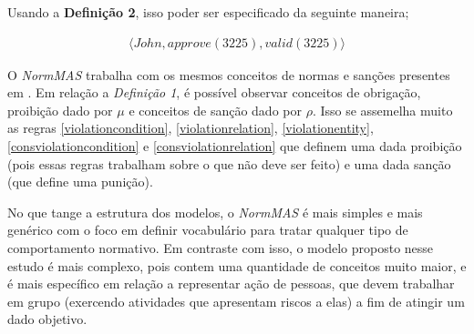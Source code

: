 Usando a \textbf{Definição 2}, isso poder ser especificado da seguinte maneira; 

\begin{eqnarray}
    \langle John, approve(3225), valid(3225)\rangle
\end{eqnarray}

O \textit{NormMAS} trabalha com os mesmos conceitos de normas e sanções presentes em \cite{dastaniframework}. Em relação a \textit{Definição 1}, é possível observar conceitos de obrigação, proibição dado por $ \mu $ e conceitos de sanção dado por $\rho$. Isso se assemelha muito as regras \ref{violationcondition}, \ref{violationrelation}, \ref{violationentity}, \ref{consviolationcondition} e \ref{consviolationrelation} que definem uma dada proibição (pois essas regras trabalham sobre o que não deve ser feito) e uma dada sanção (que define uma punição).

No que tange a estrutura dos modelos, o \textit{NormMAS} é mais simples e mais genérico com o foco em definir vocabulário para tratar qualquer tipo de comportamento normativo. Em contraste com isso, o modelo proposto nesse estudo é mais complexo, pois contem uma quantidade de conceitos muito maior, e é mais específico em relação a representar ação de pessoas, que devem trabalhar em grupo (exercendo atividades que apresentam riscos a elas) a fim de atingir um dado objetivo. 
